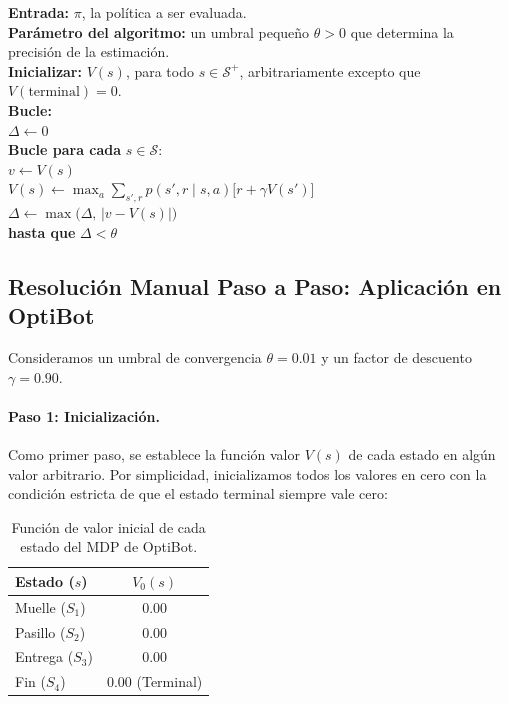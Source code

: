 \begin{tcolorbox}[
  colback=white,
  colframe=Ink,
  arc=3pt,
  boxrule=1pt,
  left=12pt, right=12pt, top=8pt, bottom=8pt,
  title={\textbf{\textcolor{white}{Evaluación Iterativa de Políticas, para estimar $V \approx v_\pi$}}},
  fonttitle=\sffamily\bfseries,
  coltitle=white
]
\textbf{Entrada:} $\pi$, la política a ser evaluada.\\
\textbf{Parámetro del algoritmo:} un umbral pequeño $\theta > 0$ que determina la precisión de la estimación.\\
\textbf{Inicializar:} $V(s)$, para todo $s \in \mathcal{S}^+$, arbitrariamente excepto que $V(\text{terminal}) = 0$.\\[6pt]
\textbf{Bucle:}\\[2pt]
\hspace*{1.5em}$\Delta \leftarrow 0$\\[2pt]
\hspace*{1.5em}\textbf{Bucle para cada} $s \in \mathcal{S}$:\\[2pt]
\hspace*{3.0em}$v \leftarrow V(s)$\\[2pt]
\hspace*{3.0em}$V(s) \leftarrow \max_{a} \sum_{s', r} p(s', r \mid s, a) \Big[ r + \gamma V(s') \Big]$\\[2pt]
\hspace*{3.0em}$\Delta \leftarrow \max\big(\Delta, \, |v - V(s)|\big)$\\[4pt]
\textbf{hasta que} $\Delta < \theta$
\end{tcolorbox}

\subsection{Resolución Manual Paso a Paso: Aplicación en OptiBot}
Consideramos un umbral de convergencia $\theta = 0.01$ y un factor de descuento $\gamma = 0.90$.

\paragraph{Paso 1: Inicialización.}
Como primer paso, se establece la función valor $V(s)$ de cada estado en algún valor arbitrario. Por simplicidad, inicializamos todos los valores en cero con la condición estricta de que el estado terminal siempre vale cero:
\begin{table}[!htb]
\centering
\begin{tabular}{lc}
\toprule
\textbf{Estado ($s$)} & \textbf{$V_0(s)$} \\
\midrule
Muelle ($S_1$) & $0.00$ \\
Pasillo ($S_2$) & $0.00$ \\
Entrega ($S_3$) & $0.00$ \\
Fin ($S_4$) & $0.00$ (Terminal) \\
\bottomrule
\end{tabular}
\caption{Función de valor inicial de cada estado del MDP de OptiBot.}
\label{tab:v0_init}
\end{table}

